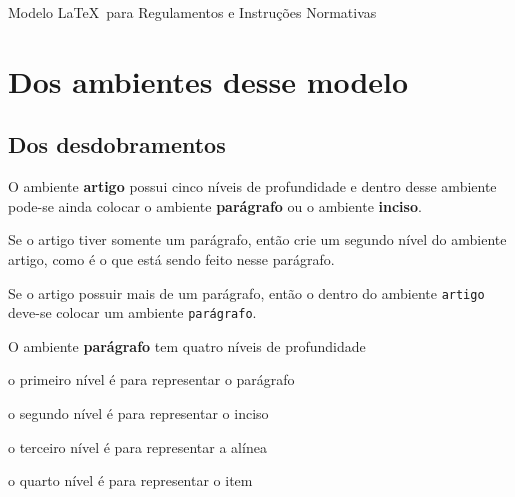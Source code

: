 \documentclass[11pt,twoside,a4paper]{inifsc}
\begin{document}
\begin{normativa}{Modelo \LaTeX~para Regulamentos e Instruções Normativas}
\chapter{Dos ambientes desse modelo}

\section{Dos desdobramentos}

\begin{artigo}
    \item O ambiente \textbf{artigo} possui cinco níveis de profundidade e dentro desse ambiente pode-se ainda colocar o ambiente \textbf{parágrafo} ou o ambiente \textbf{inciso}.
    \begin{artigo}
        \item Se o artigo tiver somente um parágrafo, então crie um segundo nível do ambiente artigo, como é o que está sendo feito nesse parágrafo.
        \begin{artigo}
            \item Se o artigo possuir mais de um parágrafo, então o dentro do ambiente \texttt{artigo} deve-se colocar um ambiente \texttt{parágrafo}.
        \end{artigo}
    \end{artigo}


    \item\label{art:comparagrafoaserref}
    O ambiente \textbf{parágrafo} tem quatro níveis de profundidade
    \begin{paragrafo}
        \item\label{par:nivelparagrafo}
        o primeiro nível é para representar o parágrafo
        \begin{paragrafo}
            \item\label{inc:segnivelparagrafo}
             o segundo nível é para representar o inciso
            \begin{paragrafo}
                \item\label{ali:ternivelparagrafo}
                o terceiro nível é para representar a alínea
                \begin{paragrafo}
                    \item o quarto nível é para representar o item
                \end{paragrafo}
            \end{paragrafo}
        \end{paragrafo}
    \end{paragrafo}


\end{artigo}
\end{normativa}
\end{document}

